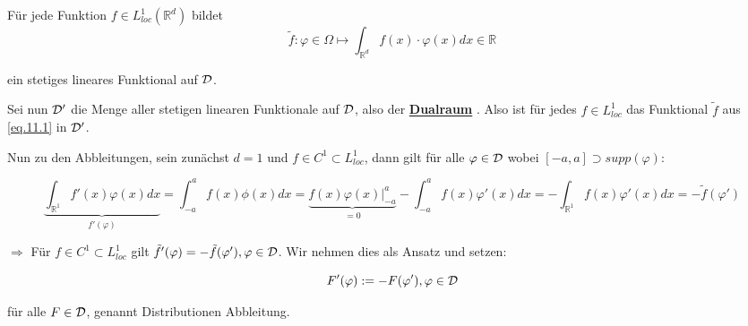 \documentclass{article}
\theoremstyle{plain}
\theoremstyle{definition}
\numberwithin{equation}{section}
\newcommand{\R}[0] {
\mathbb R
}
\newcommand{\mim}[1] {
\underline{\textbf{#1\index{#1}}}
}
\newcommand{\C}[0]{
    \cdot
}
\begin{document}
Für jede Funktion $f \in L^1_{loc}(\R^d)$ bildet 
\begin{equation}\label{eq.11.1}
    \tilde f:\varphi \in \Omega \mapsto \int_{\R^d} f(x) \C \varphi(x) dx \in \R
\end{equation}

ein stetiges lineares Funktional auf $\mathcal{D}$.

Sei nun $\mathcal{D}'$ die Menge aller stetigen linearen Funktionale auf $\mathcal{D}$, also der \mim{Dualraum}. Also ist für jedes $f \in L^1_{loc}$ das Funktional $\tilde f$ aus \eqref{eq.11.1} in $\mathcal{D}'$.

\begin{center}
\end{center}

Nun zu den Abbleitungen, sein zunächst $d=1$ und $f \in C^1 \subset L^1_{loc}$, dann gilt für alle $\varphi \in \mathcal{D}$ wobei $[-a,a] \supset supp(\varphi)$:

\[\underbrace{\int_{\R^1} f'(x) \varphi(x) dx}_{f'(\varphi)} = \int_{-a}^a f(x) \phi(x) dx = \underbrace{f(x)\varphi(x)|_{-a}^{a}}_{=0} - \int_{-a}^a f(x) \varphi'(x) dx = -\int_{\R^1} f(x) \varphi'(x) dx = -\tilde f(\varphi')\]

$\Rightarrow$ Für $f \in C^1 \subset L^1_{loc}$ gilt $\tilde f'(\varphi) = - \tilde f(\varphi'), \varphi \in \mathcal{D}$. Wir nehmen dies als Ansatz und setzen:

\begin{equation}\label{eq.11.2}
    F'(\varphi):=-F(\varphi'), \varphi \in \mathcal{D}
\end{equation}

für alle $F\in \mathcal{D}$, genannt Distributionen Abbleitung.
\end{document}
